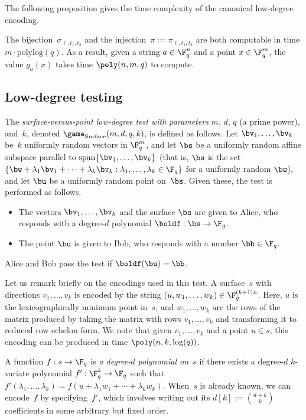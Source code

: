The following proposition gives the time complexity of the canonical low-degree encoding.

\begin{proposition}\label{prop:canonical-time}
The bijection~$\sigma_{\ell, t_1, t_2}$ and the injection~$\pi:=\pi_{\ell, t_1, t_2}$ are both computable in time $m \cdot \mathrm{poly log}(q)$.
As a result, given a string $a \in \F_q^n$ and a point $x \in \F_q^m$, the value $g_a(x)$ takes time $\poly(n, m, q)$ to compute.
\end{proposition}

\subsection{Low-degree testing}

\begin{definition}
The \emph{surface-versus-point low-degree test with parameters} $m$, $d$, $q$ (a prime power), and~$k$, denoted $\game_{\mathrm{Surface}}(m, d, q, k)$, is defined as follows.
Let $\bv_1, \ldots,\bv_k$ be~$k$ uniformly random vectors in $\F_q^m$, and
let $\bs$ be a uniformly random affine subspace parallel to
$\mathrm{span}\{\bv_1, \ldots, \bv_k\}$ (that is, $\bs$ is the set $\{\bw + \lambda_1 \bv_1 +\cdots
+\lambda_k \bv_k : \lambda_1, \ldots, \lambda_k \in \F_q\}$ for a uniformly
random $\bw$),
and let $\bu$ be a uniformly random point on~$\bs$.
Given these, the test is performed as follows.
\begin{itemize}
\itemsep -.5pt
\item[$\circ$] The vectors $\bv_1, \ldots, \bv_k$ and the surface $\bs$ are given to Alice, who responds with a degree-$d$ polynomial $\boldf: \bs \rightarrow \F_q$.
\item[$\circ$] The point $\bu$ is given to Bob, who responds with a number $\bb \in \F_q$.
\end{itemize}
Alice and Bob pass the test if $\boldf(\bu) = \bb$.
\end{definition}

\begin{remark}
Let us remark briefly on the encodings used in this test.
A surface~$s$ with directions $v_1, \ldots, v_k$
is encoded by the string $(u, w_1, \ldots, w_k) \in \F_q^{(k+1) n}$.
Here, $u$ is the lexicographically minimum point in~$s$,
and $w_1, \ldots, w_k$ are the rows of the matrix produced by taking the matrix with rows $v_1, \ldots, v_k$
and transforming it to reduced row echelon form.
We note that given $v_1, \ldots, v_k$ and a point $u \in s$,
this encoding can be produced in time $\poly(n, k, \log(q))$.

A function $f:s\rightarrow \F_q$ is \emph{a degree-$d$ polynomial on~$s$}
if there exists a degree-$d$ $k$-variate polynomial $f':\F_q^k \rightarrow \F_q$
such that $f'(\lambda_1, \ldots, \lambda_k) = f(u + \lambda_1 w_1 + \cdots + \lambda_k w_k)$.
When~$s$ is already known, we can encode~$f$ by specifying~$f'$,
which involves writing out its $d[k] := \binom{d+k}{k}$ coefficients in some arbitrary but fixed order.
\end{remark}


